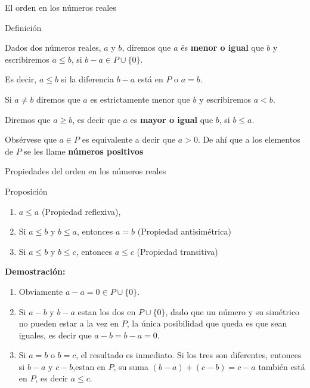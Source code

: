 \documentclass[
  ignorenonframetext,
]{beamer}
\begin{document}
\begin{frame}{El orden en los números reales}
\protect\hypertarget{el-orden-en-los-nuxfameros-reales}{}

Definición

Dados dos números reales, \(a\) y \(b\), diremos que \(a\) és
\textbf{menor o igual} que \(b\) y escribiremos \(a \leq b\), si
\(b-a \in P \cup \{0\}\).

Es decir, \(a \leq b\) si la diferencia \(b-a\) está en \(P\) o \(a=b\).

Si \(a\neq b\) diremos que \(a\) es estrictamente menor que \(b\) y
escribiremos \(a<b\).

Diremos que \(a \geq b\), es decir que \(a\) es \textbf{mayor o igual}
que \(b\), si \(b \leq a\).

Obsérvese que \(a \in P\) es equivalente a decir que \(a > 0\). De ahí
que a los elementos de \(P\) se les llame \textbf{números positivos}

\end{frame}

\begin{frame}{Propiedades del orden en los números reales}
\protect\hypertarget{propiedades-del-orden-en-los-nuxfameros-reales}{}

Proposición

\begin{enumerate}
\item
  \(a \leq a\) (Propiedad reflexiva),
\item
  Si \(a \leq b\) y \(b \leq a\), entonces \(a=b\) (Propiedad
  antisimétrica)
\item
  Si \(a \leq b\) y \(b \leq c\), entonces \(a \leq c\) (Propiedad
  transitiva)
\end{enumerate}

\textbf{Demostración:}

\begin{enumerate}
\item
  Obviamente \(a-a=0 \in P \cup \{ 0\}\).
\item
  Si \(a-b\) y \(b-a\) estan los dos en \(P \cup \{ 0\}\), dado que un
  número y su simétrico no pueden estar a la vez en \(P\), la única
  posibilidad que queda es que sean iguales, es decir que \(a-b=b-a=0\).
\item
  Si \(a=b\) o \(b=c\), el resultado es inmediato. Si los tres son
  diferentes, entonces si \(b-a\) y \(c-b\),estan en \(P\), su suma
  \((b-a)+(c-b)=c-a\) también está en \(P\), es decir \(a \leq c\).
\end{enumerate}

\end{frame}
\end{document}
